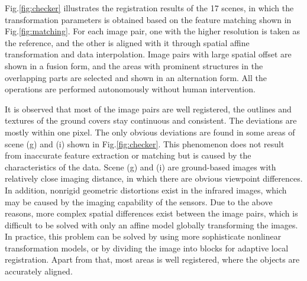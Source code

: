 Fig.\ref{fig:checker} illustrates the registration results of the 17 scenes, in which the transformation parameters is obtained based on the feature matching shown in Fig.\ref{fig:matching}. For each image pair, one with the higher resolution is taken as the reference, and the other is aligned with it through spatial affine transformation and data interpolation. Image pairs with large spatial offset are shown in a fusion form, and the areas with prominent structures in the overlapping parts are selected and shown in an alternation form. All the operations are performed autonomously without human intervention.

It is observed that most of the image pairs are well registered, the outlines and textures of the ground covers stay continuous and consistent. The deviations are mostly within one pixel. The only obvious deviations are found in some areas of scene (g) and (i) shown in Fig.\ref{fig:checker}. This phenomenon does not result from inaccurate feature extraction or matching but is caused by the characteristics of the data. Scene (g) and (i) are ground-based images with relatively close imaging distance, in which there are obvious viewpoint differences. In addition, nonrigid geometric distortions exist in the infrared images, which may be caused by the imaging capability of the sensors. Due to the above reasons, more complex spatial differences exist between the image pairs, which is difficult to be solved with only an affine model globally transforming the images. In practice, this problem can be solved by using more sophisticate nonlinear transformation models, or by dividing the image into blocks for adaptive local registration. Apart from that, most areas is well registered, where the objects are accurately aligned.
